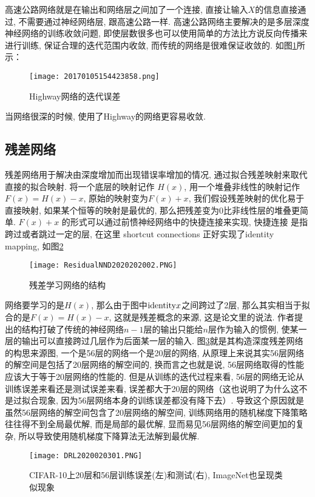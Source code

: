 高速公路网络就是在输出和网络层之间加了一个连接, 直接让输入$X$的信息直接通过, 不需要通过神经网络层, 跟高速公路一样.
高速公路网络主要解决的是多层深度神经网络的训练收敛问题, 即使层数很多也可以使用简单的方法比方说反向传播来进行训练, 保证合理的迭代范围内收敛, 而传统的网络是很难保证收敛的. 如图\ref{20170105154423858}所示：
\begin{figure}[H]
\centering
\texttt{[image: 20170105154423858.png]}
\caption{Highway网络的迭代误差}
\label{20170105154423858}
\end{figure}
当网络很深的时候, 使用了Highway的网络更容易收敛.
\subsection{残差网络}
残差网络用于解决由深度增加而出现错误率增加的情况, 通过拟合残差映射来取代直接的拟合映射.
将一个底层的映射记作 $H(x)$, 用一个堆叠非线性的映射记作 $F(x) = H(x) - x$, 原始的映射变为$F(x) + x$, 我们假设残差映射的优化易于直接映射, 如果某个恒等的映射是最优的, 那么把残差变为0比非线性层的堆叠更简单.
$F(x) + x$ 的形式可以通过前愦神经网络中的快捷连接来实现, 快捷连接 是指跨过或者跳过一定的层, 在这里 shortcut connections 正好实现了identity mapping, 如图\ref{ResidualNND2020202002}
\begin{figure}[H]
\centering
\texttt{[image: ResidualNND2020202002.PNG]}
\caption{残差学习网络的结构}
\label{ResidualNND2020202002}
\end{figure}
网络要学习的是$H(x)$, 那么由于图中$\textup{identity} x$之间跨过了2层, 那么其实相当于拟合的是$F(x)=H(x)-x$, 这就是残差概念的来源, 这是论文里的说法.
作者提出的结构打破了传统的神经网络$n-1$层的输出只能给$n$层作为输入的惯例, 使某一层的输出可以直接跨过几层作为后面某一层的输入.
图\ref{DRL2020020301}就是其构造深度残差网络的构思来源图, 一个是56层的网络一个是20层的网络, 从原理上来说其实56层网络的解空间是包括了20层网络的解空间的, 换而言之也就是说, 56层网络取得的性能应该大于等于20层网络的性能的.
但是从训练的迭代过程来看, 56层的网络无论从训练误差来看还是测试误差来看, 误差都大于20层的网络（这也说明了为什么这不是过拟合现象, 因为56层网络本身的训练误差都没有降下去）.
导致这个原因就是虽然56层网络的解空间包含了20层网络的解空间, 训练网络用的随机梯度下降策略往往得不到全局最优解, 而是局部的最优解, 显而易见56层网络的解空间更加的复杂, 所以导致使用随机梯度下降算法无法解到最优解.
\begin{figure}[H]
\centering
\texttt{[image: DRL2020020301.PNG]}
\caption{CIFAR-10上20层和56层训练误差(左)和测试(右), ImageNet也呈现类似现象}
\label{DRL2020020301}
\end{figure}

